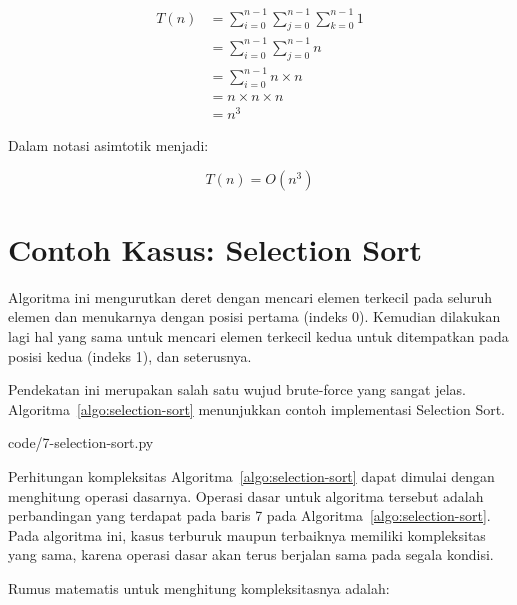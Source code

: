 \begin{equation}\label{eq:matriks-perkalian-kompleksitas}
    \begin{aligned}
        T(n) & = \sum\limits_{i=0}^{n-1} \sum\limits_{j=0}^{n-1} \sum\limits_{k=0}^{n-1} 1 \\
             & = \sum\limits_{i=0}^{n-1} \sum\limits_{j=0}^{n-1} n \\
             & = \sum\limits_{i=0}^{n-1} n \times n \\
             & = n \times n \times n \\
             & = n^3
    \end{aligned}
\end{equation}

Dalam notasi asimtotik menjadi:

\begin{equation}\label{eq:matriks-perkalian-kompleksitas-final}
    T(n) = O(n^3)
\end{equation}

\section{Contoh Kasus: Selection Sort}

Algoritma ini mengurutkan deret dengan mencari elemen terkecil pada seluruh elemen dan menukarnya dengan posisi pertama (indeks 0). Kemudian dilakukan lagi hal yang sama untuk mencari elemen terkecil kedua untuk ditempatkan pada posisi kedua (indeks 1), dan seterusnya.

Pendekatan ini merupakan salah satu wujud brute-force yang sangat jelas. Algoritma~\ref{algo:selection-sort} menunjukkan contoh implementasi Selection Sort.


                {code/7-selection-sort.py}

Perhitungan kompleksitas Algoritma~\ref{algo:selection-sort} dapat dimulai dengan menghitung operasi dasarnya. Operasi dasar untuk algoritma tersebut adalah perbandingan yang terdapat pada baris 7 pada Algoritma~\ref{algo:selection-sort}. Pada algoritma ini, kasus terburuk maupun terbaiknya memiliki kompleksitas yang sama, karena operasi dasar akan terus berjalan sama pada segala kondisi.

Rumus matematis untuk menghitung kompleksitasnya adalah:

